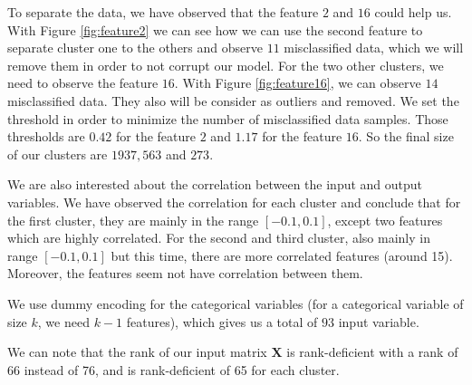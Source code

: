 \documentclass{article} %
\begin{document}
To separate the data, we have observed that the feature $2$ and $16$ could help us. With Figure \ref{fig:feature2} we can see how we can use the second feature to separate cluster one to the others and observe $11$ misclassified data, which we will remove them in order to not corrupt our model. For the two other clusters, we need to observe the feature $16$. With Figure \ref{fig:feature16}, we can observe $14$ misclassified data. They also will be consider as outliers and removed. We set the threshold in order to minimize the number of misclassified data samples. Those thresholds are $0.42$ for the feature $2$ and $1.17$ for the feature $16$. So the final size of our clusters are $1937, 563$ and $273$.

We are also interested about the correlation between the input and output variables. We have observed the correlation for each cluster and conclude that for the first cluster, they are mainly in the range $[-0.1,0.1]$, except two features which are highly correlated. For the second and third cluster, also mainly in range $[-0.1,0.1]$ but this time, there are more correlated features (around 15). Moreover, the features seem not have correlation between them.

We use dummy encoding for the categorical variables (for a categorical variable of size $k$, we need $k-1$ features), which gives us a total of $93$ input variable.

We can note that the rank of our input matrix $\mathbf{X}$ is rank-deficient with a rank of 66 instead of 76, and is rank-deficient of 65 for each cluster.
\end{document}
